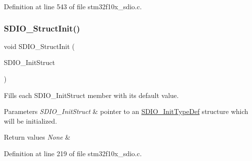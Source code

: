 Definition at line 543 of file stm32f10x\+\_\+sdio.\+c.

\mbox{\label{group___s_d_i_o___exported___functions_ga778d338c29df4fae9ef69432e6df32ad}} 
\subsubsection{\texorpdfstring{S\+D\+I\+O\+\_\+\+Struct\+Init()}{SDIO\_StructInit()}}
{\footnotesize\ttfamily void S\+D\+I\+O\+\_\+\+Struct\+Init (\begin{DoxyParamCaption}\item[{\hyperlink{struct_s_d_i_o___init_type_def}{S\+D\+I\+O\+\_\+\+Init\+Type\+Def} $\ast$}]{S\+D\+I\+O\+\_\+\+Init\+Struct }\end{DoxyParamCaption})}



Fills each S\+D\+I\+O\+\_\+\+Init\+Struct member with its default value. 


\begin{DoxyParams}{Parameters}
{\em S\+D\+I\+O\+\_\+\+Init\+Struct} & pointer to an \hyperlink{struct_s_d_i_o___init_type_def}{S\+D\+I\+O\+\_\+\+Init\+Type\+Def} structure which will be initialized. \\
\hline
\end{DoxyParams}

\begin{DoxyRetVals}{Return values}
{\em None} & \\
\hline
\end{DoxyRetVals}


Definition at line 219 of file stm32f10x\+\_\+sdio.\+c.

\mbox{\label{group___s_d_i_o___exported___functions_ga361008b5252aa33b5f2b5823ee3d7240}} 
